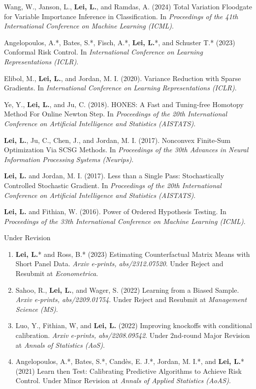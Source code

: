 \documentclass{article}
\newcommand{\red}[1]{{\color{red} #1}}
\begin{document}
\begin{enumerate}
\red{\item Wang, W., Janson, L., \textbf{Lei, L.}, and Ramdas, A. (2024) Total Variation Floodgate for Variable Importance Inference in Classification. In \emph{Proceedings of the 41th International Conference on Machine Learning (ICML)}.}
\red{\item Angelopoulos, A.*, Bates, S.*, Fisch, A.*, \textbf{Lei, L.}*, and Schuster T.* (2023) Conformal Risk Control. In \emph{International Conference on Learning Representations (ICLR)}.}
\item Elibol, M., \textbf{Lei, L.}, and Jordan, M. I. (2020). Variance Reduction with Sparse Gradients. In \emph{International Conference on Learning Representations (ICLR)}.
\item Ye, Y., \textbf{Lei, L.}, and Ju, C. (2018). HONES: A Fast and Tuning-free Homotopy Method For Online Newton Step. In \emph{Proceedings of the 20th International Conference on Artificial Intelligence and Statistics (AISTATS)}.
\item \textbf{Lei, L.}, Ju, C., Chen, J., and Jordan, M. I. (2017). Nonconvex Finite-Sum Optimization Via SCSG Methods. In \emph{Proceedings of the 30th Advances in Neural Information Processing Systems (Neurips)}.
\item \textbf{Lei, L.} and Jordan, M. I. (2017). Less than a Single Pass: Stochastically Controlled Stochastic Gradient. In \emph{Proceedings of the 20th International Conference on Artificial Intelligence and Statistics (AISTATS)}.
\item \textbf{Lei, L.} and Fithian, W. (2016). Power of Ordered Hypothesis Testing. In \emph{Proceedings of the 33th International Conference on Machine Learning (ICML)}.
\end{enumerate}

\begin{large}
\noindent Under Revision
\end{large}

\begin{enumerate}
\item \red{\textbf{Lei, L.}* and Ross, B.* (2023) Estimating Counterfactual Matrix Means with Short Panel Data. \emph{Arxiv e-prints, abs/2312.07520}. Under Reject and Resubmit at \emph{Econometrica}.}
\item Sahoo, R., \textbf{Lei, L.}, and Wager, S. (2022) Learning from a Biased Sample. \emph{Arxiv e-prints, abs/2209.01754}. Under Reject and Resubmit at \emph{Management Science (MS)}.
\item \red{Luo, Y., Fithian, W, and \textbf{Lei, L.} (2022) Improving knockoffs with conditional calibration. \emph{Arxiv e-prints, abs/2208.09542}. Under 2nd-round Major Revision at \emph{Annals of Statistics (AoS)}.}
\item \red{Angelopoulos, A.*, Bates, S.*, Cand\`{e}s, E. J.*, Jordan, M. I.*, and \textbf{Lei, L.}* (2021) Learn then Test: Calibrating Predictive Algorithms to Achieve Risk Control. Under Minor Revision at \emph{Annals of Applied Statistics (AoAS)}.}
\end{enumerate}
\end{document}

